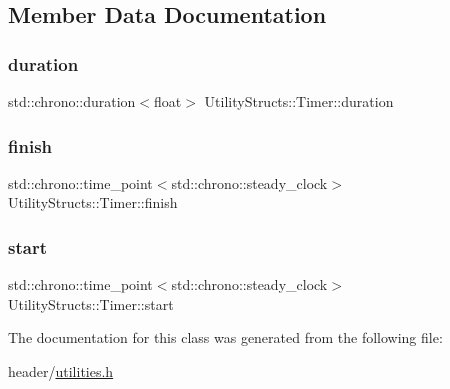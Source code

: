 \subsection{Member Data Documentation}
\mbox{\label{class_utility_structs_1_1_timer_aa78ff6477de7008371025bd459a262e4_aa78ff6477de7008371025bd459a262e4}} 
\subsubsection{\texorpdfstring{duration}{duration}}
{\footnotesize\ttfamily std\+::chrono\+::duration$<$float$>$ Utility\+Structs\+::\+Timer\+::duration}

\mbox{\label{class_utility_structs_1_1_timer_a9b87226726489b3885d6faf4373c34b5_a9b87226726489b3885d6faf4373c34b5}} 
\subsubsection{\texorpdfstring{finish}{finish}}
{\footnotesize\ttfamily std\+::chrono\+::time\+\_\+point$<$std\+::chrono\+::steady\+\_\+clock$>$ Utility\+Structs\+::\+Timer\+::finish}

\mbox{\label{class_utility_structs_1_1_timer_a60bc754cb86990dad0003e8d49048c07_a60bc754cb86990dad0003e8d49048c07}} 
\subsubsection{\texorpdfstring{start}{start}}
{\footnotesize\ttfamily std\+::chrono\+::time\+\_\+point$<$std\+::chrono\+::steady\+\_\+clock$>$ Utility\+Structs\+::\+Timer\+::start}



The documentation for this class was generated from the following file\+:\begin{DoxyCompactItemize}
\item 
header/\hyperlink{utilities_8h}{utilities.\+h}\end{DoxyCompactItemize}
